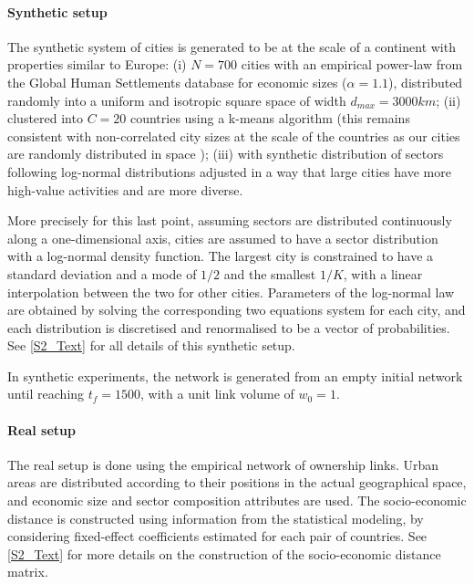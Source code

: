 \documentclass[10pt,letterpaper]{article}
\begin{document}
\paragraph{Synthetic setup}

The synthetic system of cities is generated to be at the scale of a continent with properties similar to Europe: (i) $N=700$ cities with an empirical power-law from the Global Human Settlements database for economic sizes ($\alpha = 1.1$), distributed randomly into a uniform and isotropic square space of width $d_{max}=3000km$;
(ii) clustered into $C = 20$ countries using a k-means algorithm (this remains consistent with non-correlated city sizes at the scale of the countries as our cities are randomly distributed in space \cite{simini2019testing});
(iii) with synthetic distribution of sectors following log-normal distributions adjusted in a way that large cities have more high-value activities and are more diverse.

More precisely for this last point, assuming sectors are distributed continuously along a one-dimensional axis, cities are assumed to have a sector distribution with a log-normal density function. The largest city is constrained to have a standard deviation and a mode of $1/2$ and the smallest $1/K$, with a linear interpolation between the two for other cities. Parameters of the log-normal law are obtained by solving the corresponding two equations system for each city, and each distribution is discretised and renormalised to be a vector of probabilities. See \ref{S2_Text} for all details of this synthetic setup.

In synthetic experiments, the network is generated from an empty initial network until reaching $t_f=1500$, with a unit link volume of $w_0 = 1$.

     
\paragraph{Real setup}

The real setup is done using the empirical network of ownership links. Urban areas are distributed according to their positions in the actual geographical space, and economic size and sector composition attributes are used. The socio-economic distance is constructed using information from the statistical modeling, by considering fixed-effect coefficients estimated for each pair of countries. See \ref{S2_Text} for more details on the construction of the socio-economic distance matrix.
\end{document}
